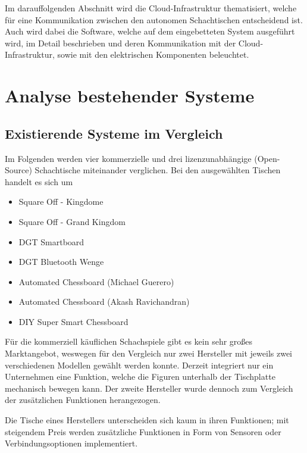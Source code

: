 Im darauffolgenden Abschnitt wird die Cloud-Infrastruktur thematisiert,
welche für eine Kommunikation zwischen den autonomen Schachtischen
entscheidend ist. Auch wird dabei die Software, welche auf dem
eingebetteten System ausgeführt wird, im Detail beschrieben und deren
Kommunikation mit der Cloud-Infrastruktur, sowie mit den elektrischen
Komponenten beleuchtet.

\hypertarget{analyse-bestehender-systeme}{%
\chapter{Analyse bestehender
Systeme}\label{analyse-bestehender-systeme}}

\hypertarget{existierende-systeme-im-vergleich}{%
\section{Existierende Systeme im
Vergleich}\label{existierende-systeme-im-vergleich}}

Im Folgenden werden vier kommerzielle und drei lizenzunabhängige
(Open-Source) Schachtische miteinander verglichen. Bei den ausgewählten
Tischen handelt es sich um

\begin{itemize}
\tightlist
\item
  Square Off - Kingdome
\item
  Square Off - Grand Kingdom
\item
  DGT Smartboard
\item
  DGT Bluetooth Wenge
\item
  Automated Chessboard (Michael Guerero)
\item
  Automated Chessboard (Akash Ravichandran)
\item
  DIY Super Smart Chessboard
\end{itemize}

Für die kommerziell käuflichen Schachspiele gibt es kein sehr großes
Marktangebot, weswegen für den Vergleich nur zwei Hersteller mit jeweils
zwei verschiedenen Modellen gewählt werden konnte. Derzeit integriert
nur ein Unternehmen eine Funktion, welche die Figuren unterhalb der
Tischplatte mechanisch bewegen kann. Der zweite Hersteller wurde dennoch
zum Vergleich der zusätzlichen Funktionen herangezogen.

Die Tische eines Herstellers unterscheiden sich kaum in ihren
Funktionen; mit steigendem Preis werden zusätzliche Funktionen in Form
von Sensoren oder Verbindungsoptionen implementiert.

